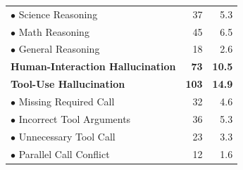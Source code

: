 \begin{table}[h]
{\begin{tabular}{lrr}
                \hspace{0.6cm} \hspace{0.3cm} $\bullet$ Science Reasoning &  37 & 5.3 \\ 
                \hspace{0.6cm} \hspace{0.3cm} $\bullet$ Math Reasoning &  45 & 6.5 \\ 
                \hspace{0.6cm} \hspace{0.3cm} $\bullet$ General Reasoning &  18 & 2.6 \\ 
             \rowcolor{category-S4} 
            \hspace{0.3cm} \textbf{Human-Interaction Hallucination} &  \textbf{73} & \textbf{10.5} \\ 
            \rowcolor{category-S5} 
            \hspace{0.3cm} \textbf{Tool-Use Hallucination} &  \textbf{103} & \textbf{14.9} \\ 
                \hspace{0.6cm} \hspace{0.3cm} $\bullet$ Missing Required Call & 32 & 4.6 \\ 
                \hspace{0.6cm} \hspace{0.3cm} $\bullet$ Incorrect Tool Arguments &  36 & 5.3 \\
                \hspace{0.6cm} \hspace{0.3cm} $\bullet$ Unnecessary Tool Call &  23 & 3.3 \\ 
                \hspace{0.6cm} \hspace{0.3cm} $\bullet$ Parallel Call Conflict &  12 & 1.6 \\ 
            \bottomrule
        \end{tabular}
    }
\end{table}

















